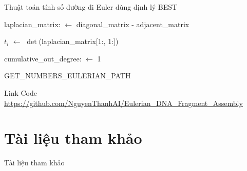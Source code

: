\documentclass[10pt]{beamer}
\theoremstyle{remark}
\numberwithin{algocf}{section}
\numberwithin{equation}{section}
\numberwithin{dl}{section}
\numberwithin{figure}{section}
\begin{document}
\begin{frame}{Thuật toán tính số đường đi Euler dùng định lý BEST}
{\begin{minipage}{2.5\linewidth}
\begin{algorithm}[H]
                    laplacian\_matrix:  $\gets$ diagonal\_matrix - adjacent\_matrix\;

                    $t_i$ $\gets$ $\det$(laplacian\_matrix[1:, 1:])\;

                    cumulative\_out\_degree:  $\gets$ 1\;
                    \;
                    \caption{GET\_NUMBERS\_EULERIAN\_PATH}
                \end{algorithm}
            \end{minipage}
        }
    \endgroup
\end{frame}

\begin{frame}{Link Code}
    \url{https://github.com/NguyenThanhAI/Eulerian_DNA_Fragment_Assembly}
\end{frame}

\section{Tài liệu tham khảo}
\begin{frame}[allowframebreaks]{Tài liệu tham khảo}
    \printbibliography
\end{frame}
\end{document}
